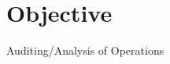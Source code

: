 \documentclass{nfriend-resume}
\begin{document}
 

\MakeHeader
       
\section{Objective}
\noindent
Auditing/Analysis of Operations
\end{document}

